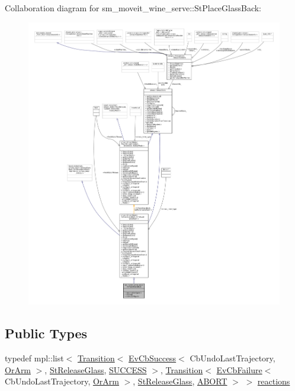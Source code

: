 Collaboration diagram for sm\+\_\+moveit\+\_\+wine\+\_\+serve\+:\+:St\+Place\+Glass\+Back\+:
\nopagebreak
\begin{figure}[H]
\begin{center}
\leavevmode
\includegraphics[width=350pt]{structsm__moveit__wine__serve_1_1StPlaceGlassBack__coll__graph}
\end{center}
\end{figure}
\subsection*{Public Types}
\begin{DoxyCompactItemize}
\item 
typedef mpl\+::list$<$ \hyperlink{classsmacc_1_1Transition}{Transition}$<$ \hyperlink{structsmacc_1_1EvCbSuccess}{Ev\+Cb\+Success}$<$ Cb\+Undo\+Last\+Trajectory, \hyperlink{classsm__moveit__wine__serve_1_1OrArm}{Or\+Arm} $>$, \hyperlink{structsm__moveit__wine__serve_1_1StReleaseGlass}{St\+Release\+Glass}, \hyperlink{structsmacc_1_1default__transition__tags_1_1SUCCESS}{S\+U\+C\+C\+E\+SS} $>$, \hyperlink{classsmacc_1_1Transition}{Transition}$<$ \hyperlink{structsmacc_1_1EvCbFailure}{Ev\+Cb\+Failure}$<$ Cb\+Undo\+Last\+Trajectory, \hyperlink{classsm__moveit__wine__serve_1_1OrArm}{Or\+Arm} $>$, \hyperlink{structsm__moveit__wine__serve_1_1StReleaseGlass}{St\+Release\+Glass}, \hyperlink{structsmacc_1_1default__transition__tags_1_1ABORT}{A\+B\+O\+RT} $>$ $>$ \hyperlink{structsm__moveit__wine__serve_1_1StPlaceGlassBack_a12d89a7779d3053752cc5587c812fd1b}{reactions}
\end{DoxyCompactItemize}
